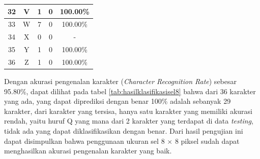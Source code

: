 \begin{longtable}[c]{|c|c|c|c|c|}
	32           & V                 & 1                       & 0                       &100.00\%            \\ \hline
	33           & W                 & 7                       & 0                       &100.00\%            \\ \hline
	34           & X                 & 0                       & 0                       & -            \\ \hline
	35           & Y                 & 1                       & 0                       &100.00\%            \\ \hline
	36           & Z                 & 1                       & 0                       &100.00\%            \\ \hline
\end{longtable}

\noindent Dengan akurasi pengenalan karakter (\textit{Character Recognition Rate}) sebesar 95.80\%, dapat dilihat pada tabel \ref{tab:hasilklasifikasisel8} bahwa dari 36  karakter yang ada, yang dapat diprediksi dengan benar 100\% adalah sebanyak 29 karakter, dari karakter yang  tersisa, hanya satu karakter yang memiliki akurasi rendah, yaitu huruf Q yang mana dari 2 karakter yang terdapat di data \textit{testing}, tidak ada yang dapat diklasifikasikan dengan benar. Dari hasil pengujian ini dapat  disimpulkan bahwa penggunaan ukuran sel 8 $\times$ 8 piksel sudah dapat menghasilkan akurasi pengenalan karakter yang baik.\\

